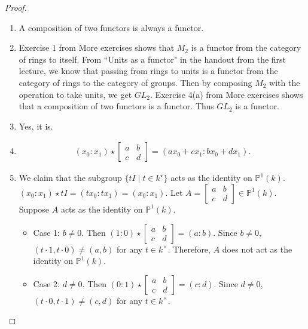 \documentclass[12pt, psamsfonts]{amsart}
\theoremstyle{definition}
\theoremstyle{remark}
\numberwithin{equation}{section}
\begin{document}
\begin{proof}
$ $
  \begin{enumerate}
    \item
      A composition of two functors is always a functor.
    \item
      Exercise 1 from More exercises shows that $M_2$ is a functor from the category of rings to itself.
      From ``Units as a functor" in the handout from the first lecture, we know that passing from rings to units is a functor from the category of rings to the category of groups.
      Then by composing $M_2$ with the operation to take units, we get $GL_2$.
      Exercise 4(a) from More exercises shows that a composition of two functors is a functor.
      Thus $GL_2$ is a functor.
    \item
      Yes, it is.
    \item
      \begin{align*}
        (x_0 : x_1) \star \begin{bmatrix} a & b \\ c & d \end{bmatrix} = (ax_0 + cx_1 : bx_0 + dx_1).
      \end{align*}
    \item
      We claim that the subgroup $\{ tI \mid t \in k^{\star}\}$ acts as the identity on $\mathbb{P}^{1}(k)$.
      $(x_0 : x_1) \star tI = (tx_0 : tx_1) = (x_0 : x_1)$.
      Let $A = \begin{bmatrix} a & b \\ c & d \end{bmatrix} \in \mathbb{P}^{1}(k)$.
      Suppose $A$ acts as the identity on $\mathbb{P}^{1}(k)$.
      \begin{itemize}
        \item
          Case 1: $b \ne 0$.
          Then $(1 : 0) \star \begin{bmatrix} a & b \\ c & d \end{bmatrix} = (a : b)$.
          Since $b \ne 0$, $(t \cdot 1, t \cdot 0) \ne (a, b)$ for any $t \in k^{\times}$.
          Therefore, $A$ does not act as the identity on $\mathbb{P}^1(k)$.
        \item
          Case 2: $d \ne 0$.
          Then $(0 : 1) \star \begin{bmatrix} a & b \\ c & d \end{bmatrix} = (c : d)$.
          Since $d \ne 0$, $(t \cdot 0, t \cdot 1) \ne (c, d)$ for any $t \in k^{\times}$.

\end{itemize}
\end{enumerate}
\end{proof}
\end{document}
